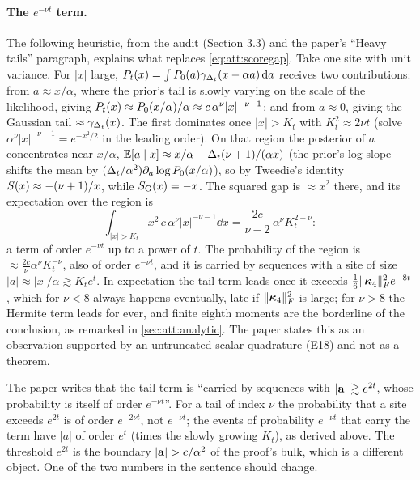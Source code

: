 \paragraph{The $e^{-\nu t}$ term.} The following heuristic, from the audit
(Section 3.3) and the paper's ``Heavy tails'' paragraph, explains what replaces
\cref{eq:att:scoregap}. Take one site with unit variance. For $|x|$ large,
$P_t(x)=\int P_0(a)\gamma_{\Delta_t}(x-\alpha a)\,\mathrm{d} a$ receives two contributions: from
$a\approx x/\alpha$, where the prior's tail is slowly varying on the scale of the
likelihood, giving $P_t(x)\approx P_0(x/\alpha)/\alpha\approx c\,\alpha^{\nu}|x|^{-\nu-1}$;
and from $a\approx0$, giving the Gaussian tail $\approx\gamma_{\Delta_t}(x)$. The first
dominates once $|x|>K_t$ with $K_t^2\approx2\nu t$ (solve $\alpha^\nu|x|^{-\nu-1}=e^{-x^2/2}$
in the leading order). On that region the posterior of $a$ concentrates near $x/\alpha$,
$\mathbb{E}[a\mid x]\approx x/\alpha-\Delta_t(\nu+1)/(\alpha x)$ (the prior's log-slope shifts the
mean by $(\Delta_t/\alpha^2)\partial_a\log P_0(x/\alpha)$), so by Tweedie's identity
$S(x)\approx-(\nu+1)/x$, while $S_{\mathrm{G}}(x)=-x$. The squared gap is $\approx x^2$
there, and its expectation over the region is
\[
  \int_{|x|>K_t}x^2\,c\,\alpha^\nu|x|^{-\nu-1}\dd x=\frac{2c}{\nu-2}\,\alpha^\nu K_t^{2-\nu}:
\]
a term of order $e^{-\nu t}$ up to a power of $t$. The probability of the region is
$\approx\frac{2c}{\nu}\alpha^\nu K_t^{-\nu}$, also of order $e^{-\nu t}$, and it is
carried by sequences with a site of size $|a|\approx|x|/\alpha\gtrsim K_te^{t}$. In
expectation the tail term leads once it exceeds $\tfrac16\lVert \bm{\kappa}_4 \rVert_{F}^2e^{-8t}$, which
for $\nu<8$ always happens eventually, late if $\lVert \bm{\kappa}_4 \rVert_{F}^2$ is large; for
$\nu>8$ the Hermite term leads for ever, and finite eighth moments are the borderline
of the conclusion, as remarked in \cref{sec:att:analytic}. The paper states this as an
observation supported by an untruncated scalar quadrature (E18) and not as a theorem.

\begin{remark}
\label{rem:att:e2t}
The paper writes that the tail term is ``carried by sequences with $|\mathbf{a}|\gtrsim e^{2t}$,
whose probability is itself of order $e^{-\nu t}$''. For a tail of index $\nu$ the
probability that a site exceeds $e^{2t}$ is of order $e^{-2\nu t}$, not $e^{-\nu t}$;
the events of probability $e^{-\nu t}$ that carry the term have $|a|$ of order
$e^{t}$ (times the slowly growing $K_t$), as derived above. The threshold $e^{2t}$ is
the boundary $|\va|>c/\alpha^2$ of the proof's bulk, which is a different object. One
of the two numbers in the sentence should change.
\end{remark}

